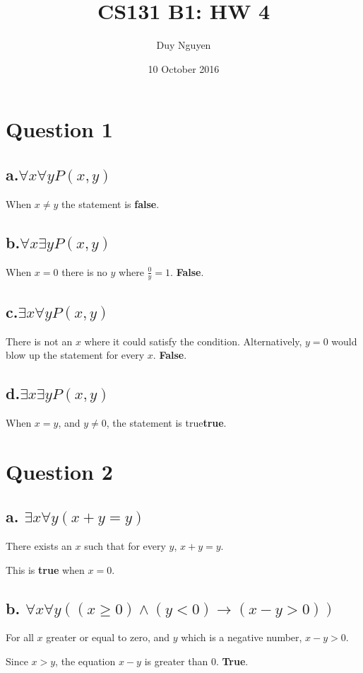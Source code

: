 \documentclass{article}
\title{CS131 B1: HW 4}
\author{Duy Nguyen}
\date{10 October 2016}
\begin{document}
\maketitle

\section*{Question 1}
\subsection*{a.$\forall x \forall y P(x,y)$}
When $ x \neq y $ the statement is \textbf{false}.
\subsection*{b.$\forall x \exists y P(x,y)$}
When $ x = 0 $ there is no $y$ where $ \frac{0}{y} = 1$. \textbf{False}.
\subsection*{c.$\exists x \forall y P(x,y)$}
There is not an $x$ where it could satisfy the condition. Alternatively, $y=0$ would blow up the statement for every $x$. \textbf{False}.
\subsection*{d.$\exists x \exists y P(x,y)$}
When $x = y$, and $y \neq 0$, the statement is true\textbf{true}.

\section*{Question 2}
\subsection*{a. $\exists x \forall y (x+y=y)$}
There exists an $x$ such that for every $y$, $x + y = y$.

This is \textbf{true} when $ x = 0$.

\subsection*{b. $\forall x \forall y ((x \geq 0) \land (y < 0) \rightarrow (x - y > 0))$}

For all $x$ greater or equal to zero, and $y$ which is a negative number, $x - y > 0$.

Since $x > y$, the equation $x - y$ is greater than 0. \textbf{True}.
\end{document}
